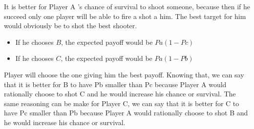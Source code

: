 \documentclass[11pt]{article}
\begin{document}
It is better for Player A 's chance of survival to shoot someone, because then if he succeed only one player will be able to fire a shot a him. The best target for him would obviously be to shot the best shooter.

\begin{itemize}
	\item If he chooses $B$, the expected payoff would be $Pa (1-Pc)$
	\item If he chooses $C$, the expected payoff would be $Pa (1-Pb)$
\end{itemize}

Player will choose the one giving him the best payoff. Knowing that, we can say that it is better for B to have Pb smaller than Pc because Player A would rationally choose to shot C and he would increase his chance or survival. The same reasoning can be make for Player C, we can say that it is better for C to have Pc smaller than Pb because Player A would rationally choose to shot B and he would increase his chance or survival.


 
\end{document}
